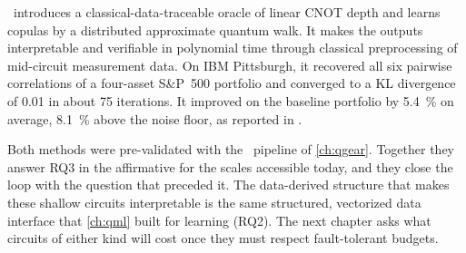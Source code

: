 \qawa\ introduces a classical-data-traceable oracle of linear CNOT depth and learns copulas by a distributed approximate quantum walk. It makes the outputs interpretable and verifiable in polynomial time through classical preprocessing of mid-circuit measurement data. On IBM Pittsburgh, it recovered all six pairwise correlations of a four-asset S\&P~500 portfolio and converged to a KL divergence of 0.01 in about 75 iterations. It improved on the baseline portfolio by \SI{5.4}{\percent} on average, \SI{8.1}{\percent} above the noise floor, as reported in \cite{guo2025qawa}.

Both methods were pre-validated with the \qgear\ pipeline of \cref{ch:qgear}. Together they answer RQ3 in the affirmative for the scales accessible today, and they close the loop with the question that preceded it. The data-derived structure that makes these shallow circuits interpretable is the same structured, vectorized data interface that \cref{ch:qml} built for learning (RQ2). The next chapter asks what circuits of either kind will cost once they must respect fault-tolerant budgets.
